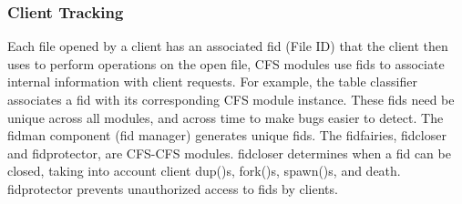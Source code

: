 \subsubsection{Client Tracking}

Each file opened by a client has an associated fid (File ID) that the
client then uses to perform operations on the open file, CFS modules
use fids to associate internal information with client requests. For
example, the table classifier associates a fid with its corresponding
CFS module instance. These fids need be unique across all modules, and
across time to make bugs easier to detect. The fidman component (fid
manager) generates unique fids. The fidfairies, fidcloser and
fidprotector, are CFS-CFS modules. fidcloser determines when a fid can
be closed, taking into account client dup()s, fork()s, spawn()s, and death.
fidprotector prevents unauthorized access to fids by clients.
